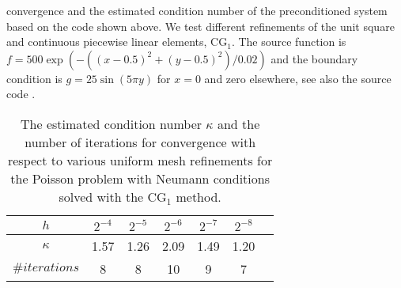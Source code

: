 convergence and the estimated condition number of the preconditioned
system based on the code shown above. We test different
refinements of the unit square and continuous piecewise linear
elements, $\mathrm{CG}_1$. The source function is $f=
500\exp(-((x-0.5)^2 + (y-0.5)^2)/0.02)$ and the boundary condition is
$g = 25 \sin(5\pi y)$ for $x=0$ and zero elsewhere, see also the
source code .
\begin{table}
\begin{center}
\begin{tabular}{|c||c|c|c|c|c|c|}
\hline
$h$ & $2^{-4}$ & $2^{-5}$ & $2^{-6}$ & $2^{-7}$ & $2^{-8}$ \\ \hline \hline
$\kappa$ & 1.57 & 1.26 & 2.09 & 1.49 & 1.20 \\ \hline
$\#iterations$ & 8 & 8 & 10 & 9 & 7 \\ \hline
\end{tabular}
\caption{The estimated condition number $\kappa$ and the number of iterations for
  convergence with respect to various uniform mesh refinements for the Poisson
  problem with Neumann conditions solved with the
  $\mathrm{CG}_1$ method.}\label{tabel:neumann}
\end{center}
\end{table}

